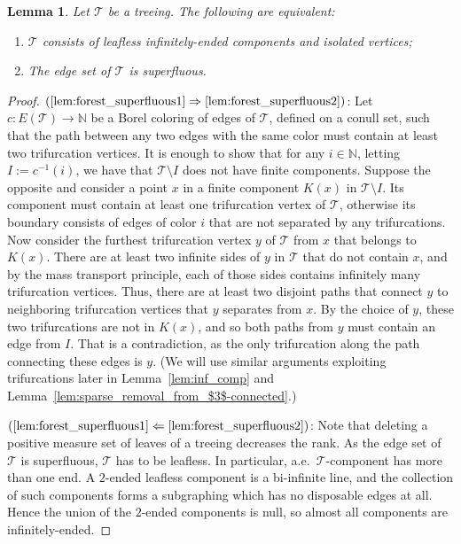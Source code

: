 \documentclass{article}
\theoremstyle{plain}
\newtheorem{lem}[thm]{Lemma}
\theoremstyle{definition}
\newcommand{\N}{\mathbb{N}}
\newcommand{\cT}{\mathcal{T}}
\begin{document}
\begin{lem}\label{lem:forest_superfluous}
    Let $\cT$ be a treeing. The following are equivalent:
    \begin{enumerate}
        \item\label{lem:forest_superfluous1} $\cT$ consists of leafless infinitely-ended components and isolated vertices;
        \item\label{lem:forest_superfluous2} The edge set of $\cT$ is %
        superfluous.
    \end{enumerate}
\end{lem}
\begin{proof}
$(\ref{lem:forest_superfluous1} \Rightarrow \ref{lem:forest_superfluous2})$: Let $c:E(\cT)\to\N$ be a Borel coloring of edges of $\cT$, defined on a conull set, such that the path between any two edges with the same color must contain at least two trifurcation vertices. It is enough to show that for any $i\in\N$, letting $I:=c^{-1}(i)$, we have that  $\cT\setminus I$ does not have finite components. %
Suppose the opposite and consider a point $x$ in a finite component $K(x)$ in $\cT\setminus I$. Its component must contain at least one trifurcation vertex of $\cT$, otherwise its boundary consists of edges of color $i$ that are not separated by any trifurcations. Now consider the furthest trifurcation vertex $y$ of $\cT$ from $x$ that belongs to $K(x)$. There are at least two infinite sides of $y$ in $\cT$ that do not contain $x$, and by the mass transport principle, each of those sides contains infinitely many trifurcation vertices. Thus, there are at least two disjoint paths that connect $y$ to neighboring trifurcation vertices that $y$ separates from $x$. By the choice of $y$, these two trifurcations are not in $K(x)$, and so both paths from $y$ must contain an edge from $I$. That is a contradiction, as the only trifurcation along the path connecting these edges is $y$. (We will use similar arguments exploiting trifurcations later in Lemma~\ref{lem:inf_comp} and Lemma~\ref{lem:sparse_removal_from_$3$-connected}.)

$(\ref{lem:forest_superfluous1} \Leftarrow \ref{lem:forest_superfluous2})$: Note that deleting a positive measure set of leaves of a treeing decreases the rank. As the edge set of $\cT$ is %
superfluous, $\cT$ has to be leafless. In particular, a.e.\ $\cT$-component has more than one end. A $2$-ended leafless component is a bi-infinite line, and the collection of such components forms a subgraphing which has no disposable edges at all. Hence the union of the $2$-ended components is null, so almost all components are infinitely-ended.
\end{proof}
\end{document}
